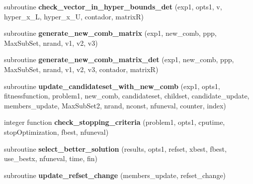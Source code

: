 \begin{DoxyCompactItemize}
\item 
\hypertarget{classscattersearchfunctions_a9b483c90cd9a0fd021f104cc76f1b854}{subroutine {\bfseries check\-\_\-vector\-\_\-in\-\_\-hyper\-\_\-bounds\-\_\-det} (exp1, opts1, v, hyper\-\_\-x\-\_\-\-L, hyper\-\_\-x\-\_\-\-U, contador, matrix\-R)}\label{classscattersearchfunctions_a9b483c90cd9a0fd021f104cc76f1b854}

\item 
\hypertarget{classscattersearchfunctions_a8c2706119d75ce70eecbc424c9930962}{subroutine {\bfseries generate\-\_\-new\-\_\-comb\-\_\-matrix} (exp1, new\-\_\-comb, ppp, Max\-Sub\-Set, nrand, v1, v2, v3)}\label{classscattersearchfunctions_a8c2706119d75ce70eecbc424c9930962}

\item 
\hypertarget{classscattersearchfunctions_ab6df72edaba95f281e94c58fe0c750a8}{subroutine {\bfseries generate\-\_\-new\-\_\-comb\-\_\-matrix\-\_\-det} (exp1, new\-\_\-comb, ppp, Max\-Sub\-Set, nrand, v1, v2, v3, contador, matrix\-R)}\label{classscattersearchfunctions_ab6df72edaba95f281e94c58fe0c750a8}

\item 
\hypertarget{classscattersearchfunctions_a736cc70ca6cc817f57eec2cbfa2d2e3d}{subroutine {\bfseries update\-\_\-candidateset\-\_\-with\-\_\-new\-\_\-comb} (exp1, opts1, fitnessfunction, problem1, new\-\_\-comb, candidateset, childset, candidate\-\_\-update, members\-\_\-update, Max\-Sub\-Set2, nrand, nconst, nfuneval, counter, index)}\label{classscattersearchfunctions_a736cc70ca6cc817f57eec2cbfa2d2e3d}

\item 
\hypertarget{classscattersearchfunctions_ad78a752b087ef9a7420fc67878111dd9}{integer function {\bfseries check\-\_\-stopping\-\_\-criteria} (problem1, opts1, cputime, stop\-Optimization, fbest, nfuneval)}\label{classscattersearchfunctions_ad78a752b087ef9a7420fc67878111dd9}

\item 
\hypertarget{classscattersearchfunctions_a3ee9b202b280a1cec6e8db852f3e01a7}{subroutine {\bfseries select\-\_\-better\-\_\-solution} (results, opts1, refset, xbest, fbest, use\-\_\-bestx, nfuneval, time, fin)}\label{classscattersearchfunctions_a3ee9b202b280a1cec6e8db852f3e01a7}

\item 
\hypertarget{classscattersearchfunctions_a1286b5e666c9d584bef1bd21d4eb9d80}{subroutine {\bfseries update\-\_\-refset\-\_\-change} (members\-\_\-update, refset\-\_\-change)}\label{classscattersearchfunctions_a1286b5e666c9d584bef1bd21d4eb9d80}


\end{DoxyCompactItemize}
